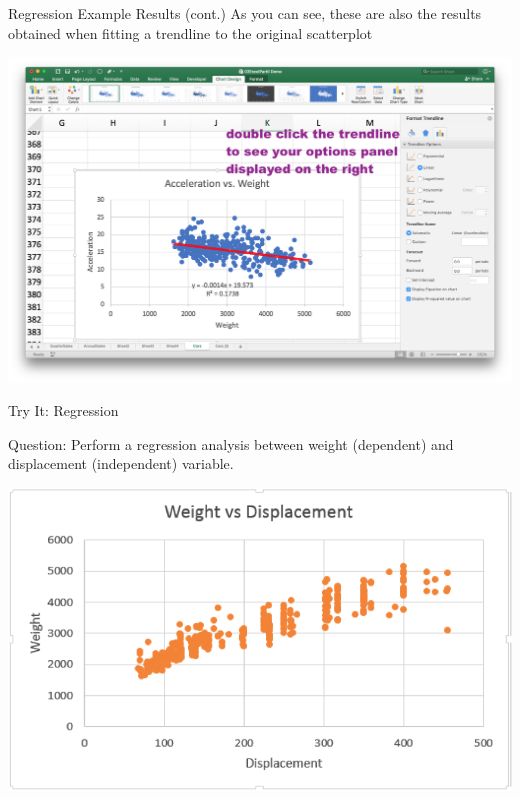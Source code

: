 \documentclass[xcolor=svgnames]{beamer}
\begin{document}
\begin{frame}[label=current]{Regression Example Results (cont.)}
As you can see, these are also the results obtained when fitting a trendline to the original scatterplot
\begin{center}
\includegraphics[width=.9\textwidth]{trendlineinfo}
\end{center}

\end{frame}



\begin{frame}[label=current]{Try It: Regression}
\begin{exampleblock}
{Question:} Perform a regression analysis between weight (dependent) and displacement (independent) variable.
\end{exampleblock}
\begin{center}
\includegraphics[width=.7\textwidth]{WvsD}
\end{center}
\end{frame}
\end{document}
